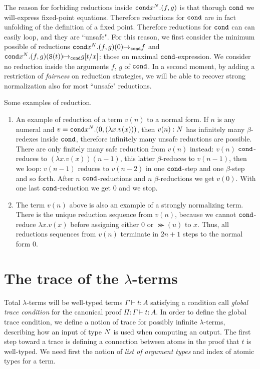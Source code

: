 \documentclass{article}
\begin{document}
The reason for forbiding
reductions inside ${\tt cond} x^{N}.(f,g)$ is that thorugh ${\tt cond}$ we will-express fixed-point equations.
Therefore reductions for ${\tt cond}$ are in fact unfolding of the definition of a fixed point. 
Therefore reductions for ${\tt cond}$ can can easily loop, and they are ``unsafe". 
For this reason, we first consider the minimum possible of reductions
${\tt cond} x^{N}.(f,g)(0) {\mapsto}_{\tt cond} f$ and
${\tt cond} x^{N}.(f,g)({\tt S} (t)) {\mapsto}_{\tt cond} g[t/x]$: those on maximal ${\tt cond}$-expression.
We consider no reduction inside the arguments $f$, $g$ of ${\tt cond}$.
In a second moment, 
by adding a restriction of \emph{fairness} on reduction strategies,
we will be able to recover strong normalization also for most ``unsafe" reductions.

Some examples of reduction.
\begin{enumerate}
\item
An example of reduction of a term $v(n)$ to a normal form. 
If $n$ is any numeral and $v = {\tt cond} x^{N}. (0, (\lambda x.v(x)) )$, then 
$v(n): {N}$ has infinitely many $\beta$-redexes inside 
${\tt cond}$, therefore infinitely many unsafe reductions are possible. There are only finitely many safe reduction
from $v(n)$ instead: $v(n)$ ${\tt cond}$-reduces to $(\lambda x.v(x))(n-1)$, 
this latter $\beta$-reduces to $v(n-1)$, 
then we loop: $v(n-1)$ reduces to $v(n-2)$ in one ${\tt cond}$-step and one $\beta$-step and so forth.
After $n$ ${\tt cond}$-reductions and 
$n$ $\beta$-reductions we get $v(0)$. With one last ${\tt cond}$-reduction we get $0$ and we stop. 
\item
The term $v(n)$ above is also an example of a strongly normalizing term.
There is the unique reduction sequence from $v(n)$, because we cannot ${\tt cond}$-reduce $\lambda x.v(x)$
before assigning either $0$ or $\Succ(u)$ to $x$. 
Thus, all reductions sequences from $v(n)$ terminate in $2n+1$ steps to the normal form $0$.
\end{enumerate}


\section{The trace of the $\lambda$-terms}
Total $\lambda$-terms will be well-typed terms $\Gamma \vdash t:A$ 
satisfying a condition call \emph{global trace condition} for the canonical proof 
$\Pi:\Gamma \vdash t:A$.
In order to define the global trace condition, 
we define a notion of trace for possibly infinite $\lambda$-terms, describing how an input of type ${N}$
is used when computing an output.
The first step toward a trace is defining a connection between atoms in the
proof that $t$ is well-typed. We need first the notion of \emph{list of argument
 types} and index of atomic types for a term.
\end{document}
